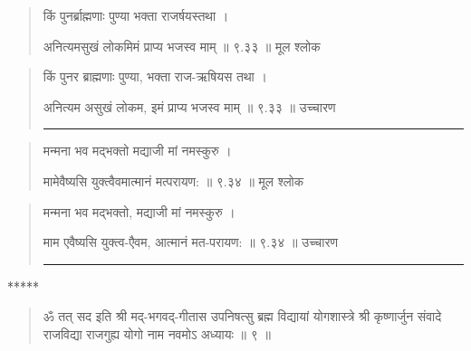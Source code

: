 \begin{quotation} 

किं पुनर्ब्राह्मणाः पुण्या भक्ता राजर्षयस्तथा  ।  

अनित्यमसुखं लोकमिमं प्राप्य भजस्व माम्‌  ॥ ९.३३ ॥  मूल श्लोक
\end{quotation}

\begin{quotation}

किं पुनर ब्राह्मणाः पुण्या, भक्ता राज-ऋषियस तथा  ।  

अनित्यम असुखं लोकम, इमं प्राप्य भजस्व माम्‌  ॥ ९.३३ ॥  उच्चारण

\noindent\rule{16cm}{0.4pt} 
\end{quotation}


\begin{quotation} 

मन्मना भव मद्भक्तो मद्याजी मां नमस्कुरु  ।  

मामेवैष्यसि युक्त्वैवमात्मानं मत्परायण:  ॥ ९.३४ ॥  मूल श्लोक
\end{quotation}

\begin{quotation}

मन्मना भव मद्भक्तो, मद्याजी मां नमस्कुरु  ।  

माम एवैष्यसि युक्त्व-एैवम, आत्मानं मत-परायण:  ॥ ९.३४ ॥  उच्चारण

\noindent\rule{16cm}{0.4pt} 
\end{quotation}

\begin{center} ***** \end{center}
\begin{quotation} 



ॐ तत् सद इति श्री मद्-भगवद्-गीतास उपनिषत्सु ब्रह्म विद्यायां योगशास्त्रे श्री कृष्णार्जुन संवादे राजविद्या राजगुह्य योगो नाम नवमोऽ अध्यायः  ॥  ९  ॥ 
\end{quotation} 
